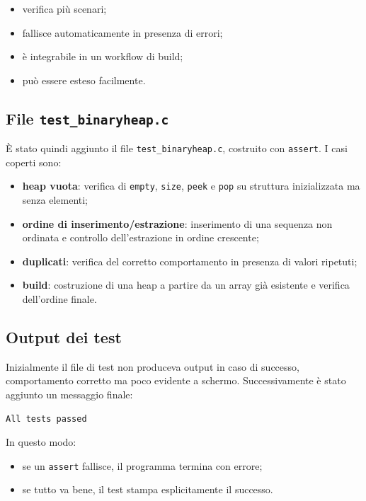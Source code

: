 \documentclass[a4paper,12pt]{article}
\begin{document}
\begin{itemize}[leftmargin=*]
    \item verifica più scenari;
    \item fallisce automaticamente in presenza di errori;
    \item è integrabile in un workflow di build;
    \item può essere esteso facilmente.
\end{itemize}

\subsection{File \texttt{test\_binaryheap.c}}

È stato quindi aggiunto il file \texttt{test\_binaryheap.c}, costruito con \texttt{assert}. I casi coperti sono:

\begin{itemize}[leftmargin=*]
    \item \textbf{heap vuota}: verifica di \texttt{empty}, \texttt{size}, \texttt{peek} e \texttt{pop} su struttura inizializzata ma senza elementi;
    \item \textbf{ordine di inserimento/estrazione}: inserimento di una sequenza non ordinata e controllo dell'estrazione in ordine crescente;
    \item \textbf{duplicati}: verifica del corretto comportamento in presenza di valori ripetuti;
    \item \textbf{build}: costruzione di una heap a partire da un array già esistente e verifica dell'ordine finale.
\end{itemize}

\subsection{Output dei test}

Inizialmente il file di test non produceva output in caso di successo, comportamento corretto ma poco evidente a schermo. Successivamente è stato aggiunto un messaggio finale:

\begin{lstlisting}
All tests passed
\end{lstlisting}

In questo modo:

\begin{itemize}[leftmargin=*]
    \item se un \texttt{assert} fallisce, il programma termina con errore;
    \item se tutto va bene, il test stampa esplicitamente il successo.
\end{itemize}
\end{document}
